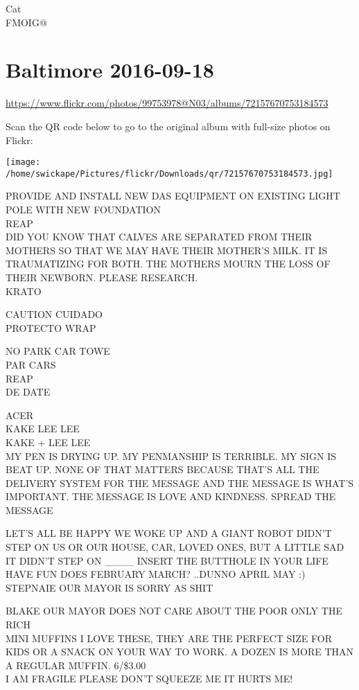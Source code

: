 \documentclass[10pt,letterpaper]{article}
\begin{document}
Cat\\
FMOIG@


\section*{Baltimore 2016-09-18}

\url{https://www.flickr.com/photos/99753978@N03/albums/72157670753184573}

Scan the QR code below to go to the original album with full-size photos on Flickr:

\texttt{[image: /home/swickape/Pictures/flickr/Downloads/qr/72157670753184573.jpg]}


PROVIDE AND INSTALL NEW DAS EQUIPMENT ON EXISTING LIGHT POLE WITH NEW FOUNDATION\\
REAP\\
DID YOU KNOW THAT CALVES ARE SEPARATED FROM THEIR MOTHERS SO THAT WE MAY HAVE THEIR MOTHER'S MILK.  IT IS TRAUMATIZING FOR BOTH.  THE MOTHERS MOURN THE LOSS OF THEIR NEWBORN.  PLEASE RESEARCH.\\
KRATO

CAUTION CUIDADO\\
PROTECTO WRAP

NO PARK CAR TOWE\\
PAR CARS\\
REAP\\
DE DATE

ACER\\
KAKE LEE LEE\\
KAKE + LEE LEE\\
MY PEN IS DRYING UP.  MY PENMANSHIP IS TERRIBLE.  MY SIGN IS BEAT UP.  NONE OF THAT MATTERS BECAUSE THAT'S ALL THE DELIVERY SYSTEM FOR THE MESSAGE AND THE MESSAGE IS WHAT'S IMPORTANT.  THE MESSAGE IS LOVE AND KINDNESS.  SPREAD THE MESSAGE

LET'S ALL BE HAPPY WE WOKE UP AND A GIANT ROBOT DIDN'T STEP ON US OR OUR HOUSE, CAR, LOVED ONES, BUT A LITTLE SAD IT DIDN'T STEP ON \_\_\_\_ INSERT THE BUTTHOLE IN YOUR LIFE\\
HAVE FUN DOES FEBRUARY MARCH?  ..DUNNO APRIL MAY :)\\
STEPNAIE OUR MAYOR IS SORRY AS SHIT

BLAKE OUR MAYOR DOES NOT CARE ABOUT THE POOR ONLY THE RICH\\
MINI MUFFINS I LOVE THESE, THEY ARE THE PERFECT SIZE FOR KIDS OR A SNACK ON YOUR WAY TO WORK.  A DOZEN IS MORE THAN A REGULAR MUFFIN.  6/\$3.00\\
I AM FRAGILE PLEASE DON'T SQUEEZE ME IT HURTS ME!
\end{document}
